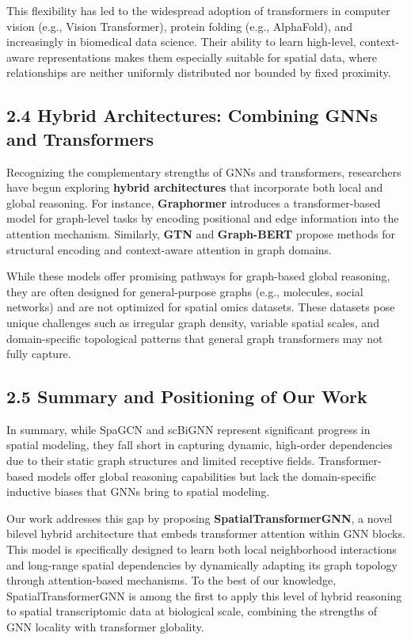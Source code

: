 \documentclass[unnumsec,webpdf,contemporary,medium]{oup-authoring-template}
\begin{document}
This flexibility has led to the widespread adoption of transformers in computer vision (e.g., Vision Transformer), protein folding (e.g., AlphaFold), and increasingly in biomedical data science. Their ability to learn high-level, context-aware representations makes them especially suitable for spatial data, where relationships are neither uniformly distributed nor bounded by fixed proximity.

\subsection*{2.4 Hybrid Architectures: Combining GNNs and Transformers}
Recognizing the complementary strengths of GNNs and transformers, researchers have begun exploring \textbf{hybrid architectures} that incorporate both local and global reasoning. For instance, \textbf{Graphormer} \cite{ying2021graphormer} introduces a transformer-based model for graph-level tasks by encoding positional and edge information into the attention mechanism. Similarly, \textbf{GTN} and \textbf{Graph-BERT} propose methods for structural encoding and context-aware attention in graph domains.

While these models offer promising pathways for graph-based global reasoning, they are often designed for general-purpose graphs (e.g., molecules, social networks) and are not optimized for spatial omics datasets. These datasets pose unique challenges such as irregular graph density, variable spatial scales, and domain-specific topological patterns that general graph transformers may not fully capture.

\subsection*{2.5 Summary and Positioning of Our Work}
In summary, while SpaGCN and scBiGNN represent significant progress in spatial modeling, they fall short in capturing dynamic, high-order dependencies due to their static graph structures and limited receptive fields. Transformer-based models offer global reasoning capabilities but lack the domain-specific inductive biases that GNNs bring to spatial modeling.

Our work addresses this gap by proposing \textbf{Spatial\-Transformer\-GNN}, a novel bilevel hybrid architecture that embeds transformer attention within GNN blocks. This model is specifically designed to learn both local neighborhood interactions and long-range spatial dependencies by dynamically adapting its graph topology through attention-based mechanisms. To the best of our knowledge, SpatialTransformerGNN is among the first to apply this level of hybrid reasoning to spatial transcriptomic data at biological scale, combining the strengths of GNN locality with transformer globality.
\end{document}
